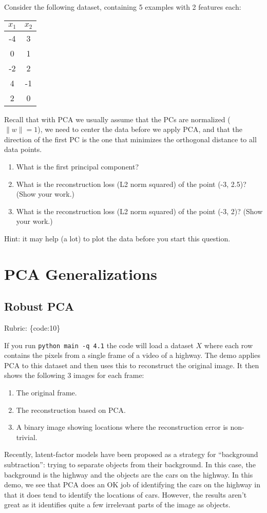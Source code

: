 \documentclass{article}
\def\rubric#1{\gre{Rubric: \{#1\}}}{}
\def\blu#1{{\color{blu}#1}}
\def\gre#1{{\color{gre}#1}}
\def\norm#1{\|#1\|}
\def\ans#1{{\color{ans}#1}}
\def\enum#1{\begin{enumerate}#1\end{enumerate}}
\begin{document}
Consider the following dataset, containing 5 examples with 2 features each:
\begin{center}
\begin{tabular}{cc}
$x_1$ & $x_2$\\
\hline
-4 & 3\\
0 & 1\\
-2 & 2\\
4 & -1\\
2 & 0\\
\end{tabular}
\end{center}
Recall that with PCA we usually assume that the PCs are normalized ($\norm{w} = 1$), we need to center the data before we apply PCA, and that the direction of the first PC is the one that minimizes the orthogonal distance to all data points.
\blu{
\enum{
\item What is the first principal component?
\ans{
}
\item What is the reconstruction loss (L2 norm squared) of the point (-3, 2.5)? (Show your work.)
\ans{
}
\item What is the reconstruction loss (L2 norm squared) of the point (-3, 2)? (Show your work.)
\ans{
}
}
}
Hint: it may help (a lot) to plot the data before you start this question.



\section{PCA Generalizations}

\subsection{Robust PCA}
\rubric{code:10}

If you run \verb|python main -q 4.1| the code will load a dataset $X$ where each row contains the pixels from a single frame of a video of a highway. The demo applies PCA to this dataset and then uses this to reconstruct the original image.
It then shows the following 3 images for each frame:
\enum{
\item The original frame.
\item The reconstruction based on PCA.
\item A binary image showing locations where the reconstruction error is non-trivial.
}
Recently, latent-factor models have been proposed as a strategy for ``background subtraction'': trying to separate objects from their background. In this case, the background is the highway and the objects are the cars on the highway. In this demo, we see that PCA does an OK job of identifying the cars on the highway in that it does tend to identify the locations of cars. However, the results aren't great as it identifies quite a few irrelevant parts of the image as objects.
\end{document}
